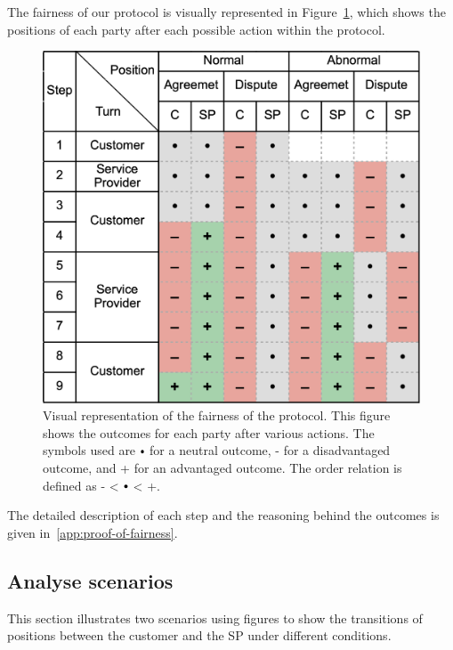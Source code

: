 \documentclass[pdftex,twocolumn,epjc3]{svjour3}
\newcommand{\plus}{+}
\newcommand{\minus}{-}
\newcommand\neutral[1][.75]{\mathbin{\ThisStyle{\vcenter{\hbox{%
  \scalebox{#1}{$\SavedStyle\bullet$}}}}}%
}
\begin{document}
The fairness of our protocol is visually represented in Figure~\ref{fig:positions}, which shows the positions of each party after each possible action within the protocol.

\begin{figure}[h!]
\includegraphics[width=\linewidth]{model.png}
\centering
\caption{Visual representation of the fairness of the protocol. This figure shows the outcomes for each party after various actions. The symbols used are $\neutral{}$ for a neutral outcome, \minus{} for a disadvantaged outcome, and \plus{} for an advantaged outcome. The order relation is defined as \minus{} < $\neutral{}$ < \plus{}.}
\label{fig:positions}
\end{figure}

The detailed description of each step and the reasoning behind the outcomes is given in~\ref{app:proof-of-fairness}.

\subsection{Analyse scenarios}\label{example-scenarios}
This section illustrates two scenarios using figures to show the transitions of positions between the customer and the SP under different conditions.
\end{document}
